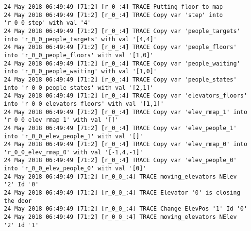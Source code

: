 \begin{lstlisting}
24 May 2018 06:49:49 [71:2] [r_0_:4] TRACE Putting floor to map
24 May 2018 06:49:49 [71:2] [r_0_:4] TRACE Copy var 'step' into 'r_0_0_step' with val '4'
24 May 2018 06:49:49 [71:2] [r_0_:4] TRACE Copy var 'people_targets' into 'r_0_0_people_targets' with val '[4,4]'
24 May 2018 06:49:49 [71:2] [r_0_:4] TRACE Copy var 'people_floors' into 'r_0_0_people_floors' with val '[1,0]'
24 May 2018 06:49:49 [71:2] [r_0_:4] TRACE Copy var 'people_waiting' into 'r_0_0_people_waiting' with val '[1,0]'
24 May 2018 06:49:49 [71:2] [r_0_:4] TRACE Copy var 'people_states' into 'r_0_0_people_states' with val '[2,1]'
24 May 2018 06:49:49 [71:2] [r_0_:4] TRACE Copy var 'elevators_floors' into 'r_0_0_elevators_floors' with val '[1,1]'
24 May 2018 06:49:49 [71:2] [r_0_:4] TRACE Copy var 'elev_rmap_1' into 'r_0_0_elev_rmap_1' with val '[]'
24 May 2018 06:49:49 [71:2] [r_0_:4] TRACE Copy var 'elev_people_1' into 'r_0_0_elev_people_1' with val '[]'
24 May 2018 06:49:49 [71:2] [r_0_:4] TRACE Copy var 'elev_rmap_0' into 'r_0_0_elev_rmap_0' with val '[-1,4,-1]'
24 May 2018 06:49:49 [71:2] [r_0_:4] TRACE Copy var 'elev_people_0' into 'r_0_0_elev_people_0' with val '[0]'
24 May 2018 06:49:49 [71:2] [r_0_0_:4] TRACE moving_elevators NElev '2' Id '0'
24 May 2018 06:49:49 [71:2] [r_0_0_:4] TRACE Elevator '0' is closing the door
24 May 2018 06:49:49 [71:2] [r_0_0_:4] TRACE Change ElevPos '1' Id '0'
24 May 2018 06:49:49 [71:2] [r_0_0_:4] TRACE moving_elevators NElev '2' Id '1'
\end{lstlisting}
